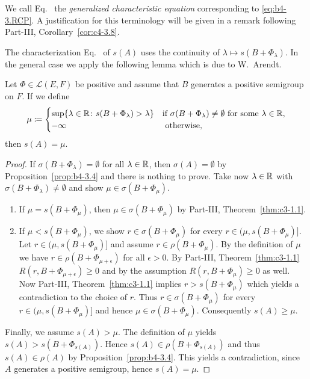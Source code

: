 \begin{remark*}
	We call Eq.~ the \emph{generalized characteristic equation} corresponding to \eqref{eq:b4-3.RCP}. 
	A justification for this terminology will be given in a remark following Part-III, Corollary~\ref{cor:c4-3.8}.
\end{remark*}
The characterization Eq.~ of\/ $s(A)$ uses the continuity of\/ $\lambda \mapsto s(B + \Phi_{\lambda})$. 
In the general case we apply the following lemma which is due to W.~Arendt.
\begin{lemma*} 
	Let  $\Phi \in \mathcal{L}(E,F)$  be positive and assume that  $B$ generates a positive semigroup on  $F$. 
	If we define
	\[
	\mu \coloneq 
	\begin{cases}
		\sup\{\lambda \in \mathbb{R} \colon s(B+\Phi_{\lambda}) > \lambda\}  & \text{if } \sigma(B+\Phi_{\lambda}) \neq \emptyset \text{ for some } \lambda \in \mathbb{R}, \\
		-\infty   &\text{ otherwise}, 
	\end{cases}
	\]
	then  $s(A) = \mu$.
\end{lemma*}	
\begin{proof}
If\/ $\sigma(B+\Phi_{\lambda}) = \emptyset$ for all $\lambda \in \mathbb{R}$, then $\sigma(A) = \emptyset$ by Proposition~\ref{prop:b4-3.4} and there is nothing to prove.
Take now $\lambda \in \mathbb{R}$ with $\sigma(B+\Phi_{\lambda}) \neq \emptyset$ and show $\mu \in \sigma(B+\Phi_{\mu})$.
\begin{enumerate}[label={Case~\arabic*: }, wide, labelindent=0em]
\item 
If\/ $\mu = s(B+\Phi_{\mu})$, then $\mu \in \sigma(B+\Phi_{\mu})$ by Part-III, Theorem~\ref{thm:c3-1.1}.

\item 
If\/ $\mu < s(B+\Phi_{\mu})$, we show $r \in \sigma(B+\Phi_{\mu})$ for every $r \in (\mu,s(B+\Phi_{\mu})]$.
Let $r \in (\mu,s(B+\Phi_{\mu})]$ and assume $r \in \rho(B+\Phi_{\mu})$. 
By the definition of\/ $\mu$ we have $r \in \rho(B+\Phi_{\mu+\epsilon})$ for all $\epsilon > 0$. 
By Part-III, Theorem~\ref{thm:c3-1.1} $R(r,B+\Phi_{\mu+\epsilon}) \geq 0$ and by the assumption $R(r,B+\Phi_{\mu}) \geq 0$ as well. 
Now Part-III, Theorem~\ref{thm:c3-1.1} implies $r > s(B+\Phi_{\mu})$ which yields a contradiction to the choice of\/ $r$. 
Thus $r \in \sigma(B+\Phi_{\mu})$ for every $r \in (\mu,s(B+\Phi_{\mu})]$ and hence $\mu \in \sigma(B+\Phi_{\mu})$. 
Consequently $s(A) \geq \mu$.
\end{enumerate}
Finally, we assume $s(A) > \mu$. 
The definition of\/ $\mu$ yields $s(A) > s(B+\Phi_{s(A)})$. 
Hence $s(A) \in \rho(B+\Phi_{s(A)})$ and thus $s(A) \in \rho(A)$ by Proposition~\ref{prop:b4-3.4}. 
This yields a contradiction, since $A$ generates a positive semigroup, hence $s(A) = \mu$.
\end{proof}

